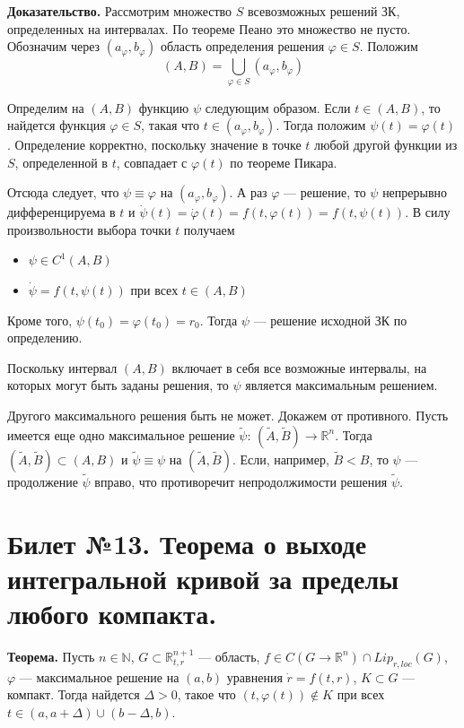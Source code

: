\documentclass{article}
\begin{document}
\noindent \textbf{Доказательство.} Рассмотрим множество $S$ всевозможных решений ЗК, определенных на интервалах. По теореме Пеано это множество не пусто. Обозначим через $(a_{\varphi}, b_{\varphi})$ область определения решения $\varphi \in S$. Положим
\begin{equation*}
    (A,B) = \bigcup_{\varphi \in S}(a_{\varphi}, b_{\varphi})
\end{equation*}

Определим на $(A,B)$ функцию $\psi$ следующим образом. Если $t \in (A,B)$, то найдется функция $\varphi \in S$, такая что $t \in (a_{\varphi}, b_{\varphi})$. Тогда положим $\psi(t) = \varphi(t)$. Определение корректно, поскольку значение в точке $t$ любой другой функции из $S$, определенной в $t$, совпадает с $\varphi(t)$ по теореме Пикара.

Отсюда следует, что $\psi \equiv \varphi$ на $(a_{\varphi}, b_{\varphi})$. А раз $\varphi$ --- решение, то $\psi$ непрерывно дифференцируема в $t$ и $\dot{\psi}(t) = \dot{\varphi}(t) = f(t,\varphi(t)) = f(t,\psi(t))$. В силу произвольности выбора точки $t$ получаем
\begin{itemize}
    \item $\psi \in C^1(A,B)$
    \item $\dot{\psi} = f(t,\psi(t))$ при всех $t \in (A,B)$
\end{itemize}
Кроме того, $\psi(t_0) = \varphi(t_0) = r_0$. Тогда $\psi$ --- решение исходной ЗК по определению.

Поскольку интервал $(A,B)$ включает в себя все возможные интервалы, на которых могут быть заданы решения, то $\psi$ является максимальным решением.

Другого максимального решения быть не может. Докажем от противного. Пусть имеется еще одно максимальное решение $\widetilde{\psi}:\, (\widetilde{A}, \widetilde{B}) \to \mathbb{R}^n$. Тогда $(\widetilde{A}, \widetilde{B}) \subset (A,B)$ и $\widetilde{\psi} \equiv \psi$ на $(\widetilde{A}, \widetilde{B})$. Если, например, $\widetilde{B} < B$, то $\psi$ --- продолжение $\widetilde{\psi}$ вправо, что противоречит непродолжимости решения $\widetilde{\psi}$.

\section{Билет №13. Теорема о выходе интегральной кривой за пределы любого компакта.}
\textbf{Теорема.} Пусть $n \in \mathbb{N}$, $G \subset \mathbb{R}_{t,r}^{n+1}$ --- область, $f \in C(G \to \mathbb{R}^n)\cap Lip_{r,loc}(G)$, $\varphi$ --- максимальное решение на $(a,b)$ уравнения $\dot{r} = f(t,r)$, $K \subset G$ --- компакт. Тогда найдется $\Delta > 0$, такое что $(t, \varphi(t)) \notin K$ при всех $t \in (a, a + \Delta) \cup (b - \Delta, b)$.\\
\end{document}
